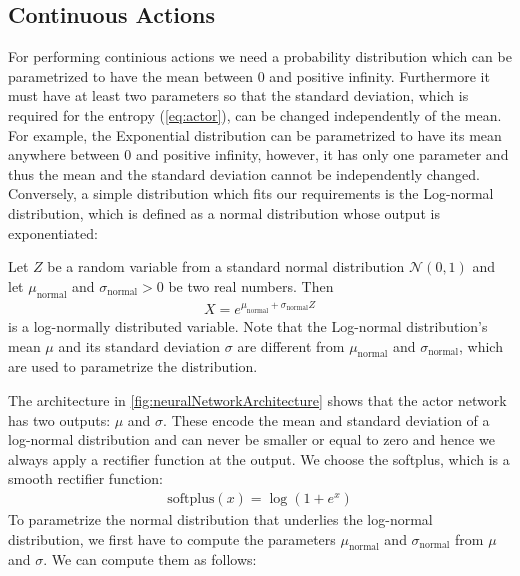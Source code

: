 \documentclass[conference]{IEEEtran}
\newcommand\note[2]{{\color{#1}#2}}
\begin{document}

\subsection{Continuous Actions}

For performing continious actions we need a probability distribution which can be parametrized to have the mean between 0 and positive infinity. Furthermore it must have at least two parameters so that the standard deviation, which is required for the entropy (\autoref{eq:actor}), can be changed independently of the mean. For example, the Exponential distribution can be parametrized to have its mean anywhere between 0 and positive infinity, however, it has only one parameter and thus the mean and the standard deviation cannot be independently changed. Conversely, a simple distribution which fits our requirements is the Log-normal distribution, which is defined as a normal distribution whose output is exponentiated:

Let $Z$ be a random variable from a standard normal distribution $\mathcal{N}(0, 1)$ and let $\mu_{\text{normal}}$ and $\sigma_{\text{normal}} > 0$ be two real numbers. Then
\begin{align}
X = e^{\mu_{\text{normal}}+\sigma_{\text{normal}} Z}
\end{align}
is a log-normally distributed variable. Note that the Log-normal distribution's mean $\mu$ and its standard deviation $\sigma$ are different from $\mu_\text{normal}$ and $\sigma_\text{normal}$, which are used to parametrize the distribution.

The architecture in \autoref{fig:neuralNetworkArchitecture} shows that the actor network has two outputs: $\mu$ and $\sigma$. These encode the mean and standard deviation of a log-normal distribution and can never be smaller or equal to zero and hence we always apply a rectifier function at the output. We choose the softplus, which is a smooth rectifier function:
\begin{align}
\text{softplus}(x) = \log\left(1 + e^x \right)
\end{align}
To parametrize the normal distribution that underlies the log-normal distribution, we first have to compute the parameters $\mu_{\text{normal}}$ and $\sigma_{\text{normal}}$ from $\mu$ and $\sigma$. We can compute them as follows:
\end{document}
